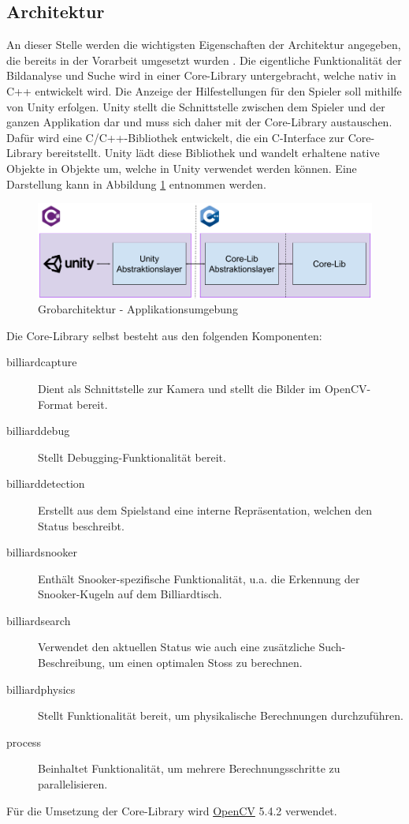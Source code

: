 \subsection{Architektur}\label{sec:architecture}

An dieser Stelle werden die wichtigsten Eigenschaften der Architektur angegeben, die bereits in der Vorarbeit umgesetzt
wurden \cite{project2:architektur}.
Die eigentliche Funktionalität der Bildanalyse und Suche wird in einer Core-Library untergebracht, welche nativ in C++ entwickelt wird.
Die Anzeige der Hilfestellungen für den Spieler soll mithilfe von Unity erfolgen. Unity stellt die Schnittstelle zwischen
dem Spieler und der ganzen Applikation dar und muss sich daher mit der Core-Library austauschen.
Dafür wird eine C/C++-Bibliothek entwickelt, die ein C-Interface zur Core-Library bereitstellt.
Unity lädt diese Bibliothek und wandelt erhaltene native Objekte in Objekte um, welche in Unity verwendet werden können.
Eine Darstellung kann in Abbildung \ref{fig:top-level-architecture} entnommen werden.

\begin{figure}[h!]
    \begin{center}
        \includegraphics[width=0.8\linewidth]{../common/03_billiard_ai/resources/00_top_level_architecture.png}
    \end{center}
    \caption{Grobarchitektur - Applikationsumgebung}
    \label{fig:top-level-architecture}
\end{figure}

Die Core-Library selbst besteht aus den folgenden Komponenten:
\begin{description}
    \item[billiard\textunderscore capture] Dient als Schnittstelle zur Kamera und stellt die Bilder im OpenCV-Format bereit.
    \item[billiard\textunderscore debug] Stellt Debugging-Funktionalität bereit.
    \item[billiard\textunderscore detection] Erstellt aus dem Spielstand eine interne Repräsentation, welchen den Status beschreibt.
    \item[billiard\textunderscore snooker] Enthält Snooker-spezifische Funktionalität, u.a. die Erkennung der Snooker-Kugeln auf dem Billiardtisch.
    \item[billiard\textunderscore search] Verwendet den aktuellen Status wie auch eine zusätzliche Such-Beschreibung, um einen optimalen
    Stoss zu berechnen.
    \item[billiard\textunderscore physics] Stellt Funktionalität bereit, um physikalische Berechnungen durchzuführen.
    \item[process] Beinhaltet Funktionalität, um mehrere Berechnungsschritte zu parallelisieren.
\end{description}

Für die Umsetzung der Core-Library wird \href{https://opencv.org}{OpenCV} 5.4.2 verwendet.
